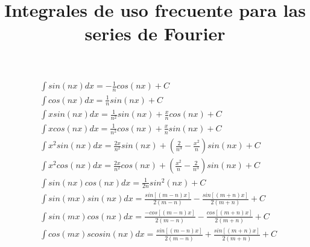 \documentclass[letterpaper]{article}
\author{}
\date{}
\title{Integrales de uso frecuente para las series de Fourier}
\begin{document}
\maketitle
\begin{align}
    & \int{sin(nx)dx}=-\frac{1}{n}cos(nx)+C  \\     %
    & \int{cos(nx)dx}=\frac{1}{n}sin(nx)+C \\       %
    & \int{xsin(nx)dx}=\frac{1}{n^2}sin(nx)+\frac{x}{n}cos(nx)+C \\  %
    & \int{xcos(nx)dx}=\frac{1}{n^2}cos(nx)+\frac{x}{n}sin(nx)+C  \\  %
    & \int{x^{2}sin(nx)dx}=\frac{2x}{n^2}sin(nx)+\left(\frac{2}{n^3}-\frac{x^2}{n}\right)sin(nx)+C \\  %
    & \int{x^{2}cos(nx)dx}=\frac{2x}{n^2}cos(nx)+\left(\frac{x^2}{n}-\frac{2}{n^3}\right)sin(nx)+C\\  %
    & \int{sin(nx)cos(nx)dx} = \frac{1}{2n}sin^2(nx)+C\\ %
    & \int{sin(mx)sin(nx)dx} = \frac{sin\left[(m-n)x\right]}{2(m-n)}-\frac{sin\left[(m+n)x\right]}{2(m+n)}+C\\ %
    & \int{sin(mx)cos(nx)dx} = \frac{-cos\left[(m-n)x\right]}{2(m-n)}-\frac{cos\left[(m+n)x\right]}{2(m+n)}+C\\ %
    & \int{cos(mx)scosin(nx)dx} = \frac{sin\left[(m-n)x\right]}{2(m-n)}+\frac{sin\left[(m+n)x\right]}{2(m+n)}+C %
\end{align}
\end{document}
